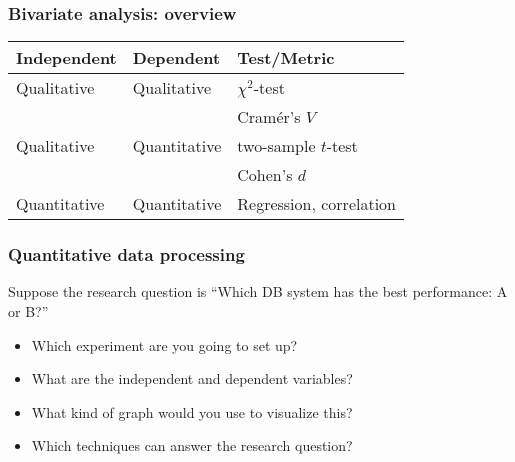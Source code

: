 \documentclass[aspectratio=169]{beamer}
\begin{document}
\begin{frame}
  \frametitle{Bivariate analysis: overview}
  \centering
  \begin{tabular}{lll}
    \toprule
    \textbf{Independent} & \textbf{Dependent} & \textbf{Test/Metric}    \\
    \midrule
    Qualitative          & Qualitative        & $\chi^2$-test           \\
                         &                    & Cramér's $V$            \\
    Qualitative          & Quantitative       & two-sample $t$-test     \\
                         &                    & Cohen's $d$             \\
    Quantitative         & Quantitative       & Regression, correlation \\
    \bottomrule
  \end{tabular}

  \bigskip

\end{frame}

\begin{frame}
  \frametitle{Quantitative data processing}

  Suppose the research question is ``Which DB system has the best performance: A or B?''

  \begin{itemize}
    \item<+-> Which experiment are you going to set up?
    \item<+-> What are the independent and dependent variables?
    \item<+-> What kind of graph would you use to visualize this?
    \item<+-> Which techniques can answer the research question?
  \end{itemize}


\end{frame}
\end{document}
